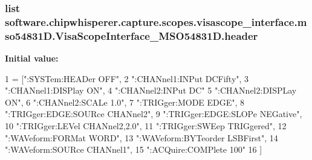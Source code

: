 \subsubsection[{header}]{\setlength{\rightskip}{0pt plus 5cm}list software.\+chipwhisperer.\+capture.\+scopes.\+visascope\+\_\+interface.\+mso54831\+D.\+Visa\+Scope\+Interface\+\_\+\+M\+S\+O54831\+D.\+header\hspace{0.3cm}{\ttfamily [static]}}\label{classsoftware_1_1chipwhisperer_1_1capture_1_1scopes_1_1visascope__interface_1_1mso54831D_1_1VisaScopeInterface__MSO54831D_a4909ceac23c06a5f78beaca5c9fc11a4}
{\bfseries Initial value\+:}
\begin{DoxyCode}
1 = [\textcolor{stringliteral}{":SYSTem:HEADer OFF"},
2                 \textcolor{stringliteral}{":CHANnel1:INPut DCFifty"},
3                 \textcolor{stringliteral}{":CHANnel1:DISPlay ON"},
4                 \textcolor{stringliteral}{":CHANnel2:INPut DC"}
5                 \textcolor{stringliteral}{":CHANnel2:DISPLay ON"},
6                 \textcolor{stringliteral}{":CHANnel2:SCALe 1.0"},
7                 \textcolor{stringliteral}{":TRIGger:MODE EDGE"},
8                 \textcolor{stringliteral}{":TRIGger:EDGE:SOURce CHANnel2"},
9                 \textcolor{stringliteral}{":TRIGger:EDGE:SLOPe NEGative"},
10                 \textcolor{stringliteral}{":TRIGger:LEVel CHANnel2,2.0"},
11                 \textcolor{stringliteral}{":TRIGger:SWEep TRIGgered"},
12                 \textcolor{stringliteral}{":WAVeform:FORMat WORD"},
13                 \textcolor{stringliteral}{":WAVeform:BYTeorder LSBFirst"},
14                 \textcolor{stringliteral}{":WAVeform:SOURce CHANnel1"},
15                 \textcolor{stringliteral}{":ACQuire:COMPlete 100"}
16                 ]
\end{DoxyCode}
\hypertarget{classsoftware_1_1chipwhisperer_1_1capture_1_1scopes_1_1visascope__interface_1_1mso54831D_1_1VisaScopeInterface__MSO54831D_ab0aec2268576e6e33008919ca2fca519}{}
